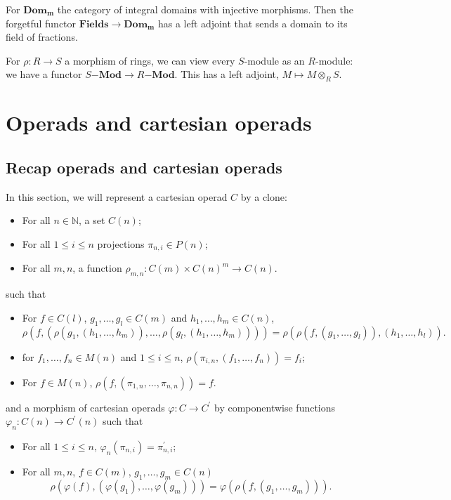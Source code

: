 \documentclass{amsbook}
\newcommand{\Catb}[1]{\mathbf{#1}}
\theoremstyle{definition}
\begin{document}
  For $ \Catb{Dom_m} $ the category of integral domains with injective morphisms. Then the forgetful functor $ \Catb{Fields} \to \Catb{Dom_m} $ has a left adjoint that sends a domain to its field of fractions.

  For $ \rho: R \to S $ a morphism of rings, we can view every $ S $-module as an $ R $-module: we have a functor $ S\Catb{-Mod} \to R\Catb{-Mod} $. This has a left adjoint, $ M \mapsto M \otimes_R S $.

  \section{Operads and cartesian operads}
  \subsection{Recap operads and cartesian operads}
  In this section, we will represent a cartesian operad $ C $ by a clone:
  \begin{itemize}
    \item For all $ n \in \mathbb N $, a set $ C(n) $;
    \item For all $ 1 \leq i \leq n $ projections $ \pi_{n, i} \in P(n) $;
    \item For all $ m, n $, a function $ \rho_{m, n}: C(m) \times C(n)^m \to C(n) $.
  \end{itemize}
  such that
  \begin{itemize}
    \item For $ f \in C(l) $, $ g_1, \dots, g_l \in C(m) $ and $ h_1, \dots, h_m \in C(n) $,
      \[ \rho(f, (\rho(g_1, (h_1, \dots, h_m)), \dots, \rho(g_l, (h_1, \dots, h_m)))) = \rho(\rho(f, (g_1, \dots, g_l)), (h_1, \dots, h_l)). \]
    \item for $ f_1, \dots, f_n \in M(n) $ and $ 1 \leq i \leq n $, $ \rho(\pi_{i, n}, (f_1, \dots, f_n)) = f_i $;
    \item For $ f \in M(n) $, $ \rho(f, (\pi_{1, n}, \dots, \pi_{n, n})) = f $.
  \end{itemize}
  and a morphism of cartesian operads $ \varphi: C \to C^\prime $ by componentwise functions $ \varphi_n: C(n) \to C^\prime(n) $ such that
  \begin{itemize}
    \item For all $ 1 \leq i \leq n $, $ \varphi_n(\pi_{n, i}) = \pi^\prime_{n, i} $;
    \item For all $ m, n $, $ f \in C(m) $, $ g_1, \dots, g_m \in C(n) $
      \[ \rho(\varphi(f), (\varphi(g_1), \dots, \varphi(g_m))) = \varphi(\rho(f, (g_1, \dots, g_m))). \]
  \end{itemize}
\end{document}
